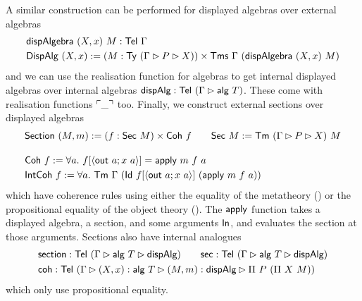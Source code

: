A similar construction can be performed for displayed algebras over external algebras
\begin{align*}
&\textsf{dispAlgebra}\ (X, x)\ M : \textsf{Tel}\ \Gamma \\
&\textsf{DispAlg}\ (X, x) := (M : \textsf{Ty}\ (\Gamma \rhd P \rhd X)) \times \textsf{Tms}\ \Gamma\ (\textsf{dispAlgebra}\ (X, x)\ M)
\end{align*}
and we can use the realisation function for algebras to get internal displayed
algebras over internal algebras $\textsf{dispAlg} : \textsf{Tel}\ (\Gamma \rhd \textsf{alg}\ T)$.
These come with realisation functions $\ulcorner \_ \urcorner$ too.
Finally, we construct external sections over displayed algebras
\begin{align*}
     &\textsf{Section}\ (M, m) := (f : \textsf{Sec}\ M) \times \textsf{Coh}\ f  \qquad \textsf{Sec}\ M := \textsf{Tm}\ (\Gamma \rhd P \rhd X)\ M \\[1em]
     &\textsf{Coh}\ f := \forall a.\ f[\langle\textsf{out}\ a; x\ a\rangle] = \textsf{apply}\ m\ f\ a \\
     &\textsf{IntCoh}\ f := \forall a.\ \textsf{Tm}\ \Gamma\ (\textsf{Id}\ f[\langle\textsf{out}\ a; x\ a\rangle]\ (\textsf{apply}\ m\ f\ a))
\end{align*}
which have coherence rules using either the equality of the metatheory () or
the propositional equality of the object theory ().
The $\textsf{apply}$ function takes a displayed algebra, a section, and some
arguments $\textsf{In}$, and evaluates the section at those arguments.
Sections also have internal analogues
\begin{align*}
    &\begin{alignedat}{2}
    &\textsf{section} : \textsf{Tel}\ (\Gamma \rhd \textsf{alg}\ T \rhd \textsf{dispAlg}) \qquad&&\textsf{sec} : \textsf{Tel}\ (\Gamma \rhd \textsf{alg}\ T \rhd \textsf{dispAlg})  \\
    \end{alignedat} \\
    &\textsf{coh} : \textsf{Tel}\ (\Gamma \rhd (X, x) : \textsf{alg}\ T\rhd (M, m) : \textsf{dispAlg} \rhd \Pi\ P\ (\Pi\ X\ M))
\end{align*}
which only use propositional equality.

